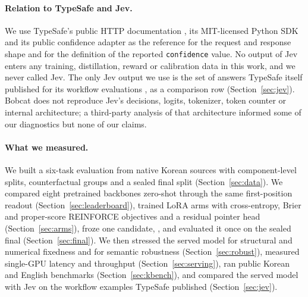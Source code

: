 \paragraph{Relation to TypeSafe and Jev.}
We use TypeSafe's public HTTP documentation \citep{typesafe_api}, its MIT-licensed Python
SDK \citep{typesafe_sdk} and its public confidence adapter \citep{typesafe_adapter} as the
reference for the request and response shape and for the definition of the reported
\texttt{confidence} value. No output of Jev enters any training,
distillation, reward or calibration data in this work, and we never called Jev. The only Jev
output we use is the set of answers TypeSafe itself published for its workflow evaluations
\citep{typesafe_evals}, as a comparison row (Section~\ref{sec:jev}). Bobcat does not reproduce Jev's decisions, logits,
tokenizer, token counter or internal architecture; a third-party analysis of that
architecture \citep{archer_jev} informed some of our diagnostics but none of our claims.

\paragraph{What we measured.}
We built a six-task evaluation from native Korean sources with component-level splits,
counterfactual groups and a sealed final split (Section~\ref{sec:data}). We compared eight
pretrained backbones zero-shot through the same first-position readout
(Section~\ref{sec:leaderboard}), trained LoRA arms with cross-entropy, Brier and
proper-score REINFORCE objectives and a residual pointer head (Section~\ref{sec:arms}),
froze one candidate, \expone, and evaluated it once on the sealed final
(Section~\ref{sec:final}). We then stressed the served model for structural and numerical
fixedness and for semantic robustness (Section~\ref{sec:robust}), measured single-GPU
latency and throughput (Section~\ref{sec:serving}), ran public Korean and English benchmarks
(Section~\ref{sec:kbench}), and compared the served model with Jev on the workflow examples
TypeSafe published (Section~\ref{sec:jev}).

